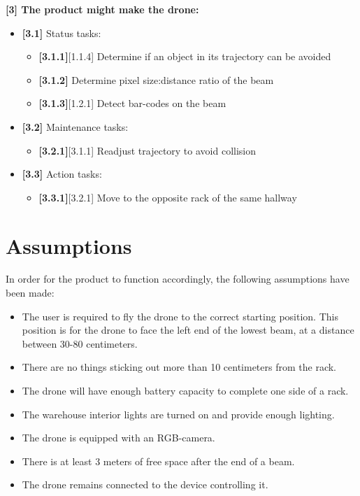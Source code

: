 \noindent
\textbf{[3] The product might make the drone:}
\begin{itemize}
	\item \textbf{[3.1]} Status tasks:
	\begin{itemize}
		\item \textbf{[3.1.1]}[1.1.4] Determine if an object in its trajectory can be avoided
		\item \textbf{[3.1.2]} Determine pixel size:distance ratio of the beam
		\item \textbf{[3.1.3]}[1.2.1] Detect bar-codes on the beam
	\end{itemize}
	\item \textbf{[3.2]} Maintenance tasks:
	\begin{itemize}
		\item \textbf{[3.2.1]}[3.1.1] Readjust trajectory to avoid collision
	\end{itemize}
	\item \textbf{[3.3]} Action tasks:
	\begin{itemize}
		\item \textbf{[3.3.1]}[3.2.1] Move to the opposite rack of the same hallway
	\end{itemize}
	
\end{itemize}

\section{Assumptions}
In order for the product to function accordingly, the following assumptions have been made:
\begin{itemize}
	\itemsep0em
	\item The user is required to fly the drone to the correct starting position. This position is for the drone to face the left end of the lowest beam, at a distance between 30-80 centimeters.
	\item There are no things sticking out more than 10 centimeters from the rack.
	\item The drone will have enough battery capacity to complete one side of a rack.
	\item The warehouse interior lights are turned on and provide enough lighting.
	\item The drone is equipped with an RGB-camera.
	\item There is at least 3 meters of free space after the end of a beam.
	\item The drone remains connected to the device controlling it.
\end{itemize}